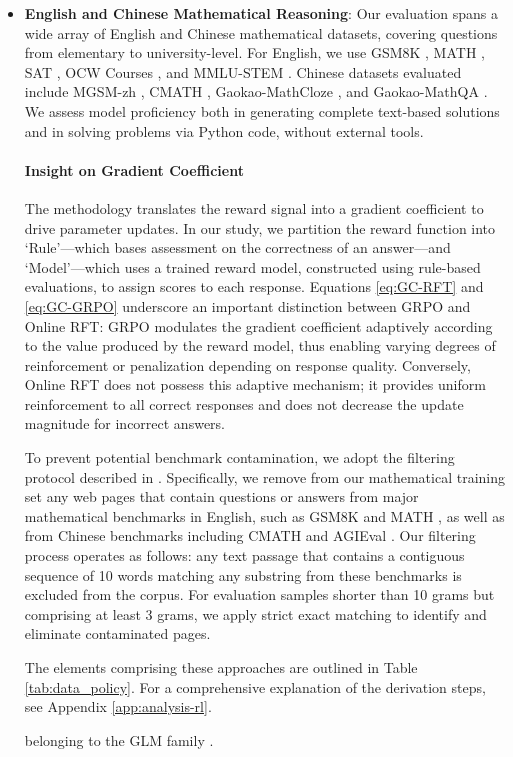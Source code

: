 \begin{itemize}[topsep=0pt]
    \item \textbf{English and Chinese Mathematical Reasoning}: Our evaluation spans a wide array of English and Chinese mathematical datasets, covering questions from elementary to university-level. For English, we use GSM8K \citep{gsm8k}, MATH \citep{MATH}, SAT \citep{llemma}, OCW Courses \citep{minerva}, and MMLU-STEM \citep{mmlu}. Chinese datasets evaluated include MGSM-zh \citep{mgsm}, CMATH \citep{wei2023cmath}, Gaokao-MathCloze \citep{agieval}, and Gaokao-MathQA \citep{agieval}. We assess model proficiency both in generating complete text-based solutions and in solving problems via Python code, without external tools.

\paragraph{Insight on Gradient Coefficient} The methodology translates the reward signal into a gradient coefficient to drive parameter updates. In our study, we partition the reward function into `Rule'—which bases assessment on the correctness of an answer—and `Model'—which uses a trained reward model, constructed using rule-based evaluations, to assign scores to each response. Equations \ref{eq:GC-RFT} and \ref{eq:GC-GRPO} underscore an important distinction between GRPO and Online RFT: GRPO modulates the gradient coefficient adaptively according to the value produced by the reward model, thus enabling varying degrees of reinforcement or penalization depending on response quality. Conversely, Online RFT does not possess this adaptive mechanism; it provides uniform reinforcement to all correct responses and does not decrease the update magnitude for incorrect answers.

To prevent potential benchmark contamination, we adopt the filtering protocol described in \cite{deepseek-coder}. Specifically, we remove from our mathematical training set any web pages that contain questions or answers from major mathematical benchmarks in English, such as GSM8K \citep{gsm8k} and MATH \citep{MATH}, as well as from Chinese benchmarks including CMATH \citep{wei2023cmath} and AGIEval \citep{agieval}. Our filtering process operates as follows: any text passage that contains a contiguous sequence of 10 words matching any substring from these benchmarks is excluded from the corpus. For evaluation samples shorter than 10 grams but comprising at least 3 grams, we apply strict exact matching to identify and eliminate contaminated pages.

The elements comprising these approaches are outlined in Table \ref{tab:data_policy}. For a comprehensive explanation of the derivation steps, see Appendix \ref{app:analysis-rl}.

    belonging to the GLM family \citep{glm}.
\end{itemize}


